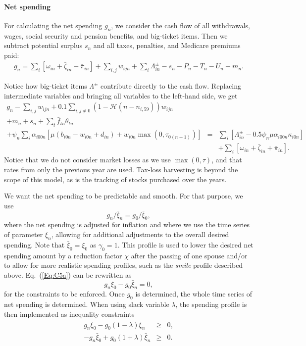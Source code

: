 \documentclass{report}[fleqn,11pt]
\begin{document}
\paragraph*{Net spending}
	For calculating the net spending $g_n$, we consider the cash flow of all withdrawals,
	wages, social security and pension benefits, and big-ticket items. 
	Then we subtract potential surplus $s_{n}$ and all taxes, penalties, and Medicare premiums paid:
	\begin{eqnarray}
		g_n = \sum_i [\omega_{in} + \bar{\zeta}_{in} + \bar{\pi}_{in} ] 
		+ \sum_{i,j} w_{ijn} + \sum_i \Lambda^\pm_{in} - s_{n}
		- P_n - T_n - U_n - m_n.
	\end{eqnarray}

	Notice how big-ticket items $\Lambda^\pm$ contribute directly to the cash flow.
	Replacing intermediate variables and bringing all variables to the left-hand side, we get
	\begin{eqnarray}
		\label{Eq:C4}
		g_n - \sum_{i,j} w_{ijn} + 0.1 \sum_{i,j\neq0} (1-\mathcal{H}(n - n_{i, 59})) w_{ijn}\nonumber\\
                + m_n + s_n + \sum_t \bar{f}_{tn} \theta_{t n} &&\nonumber \\
		+ \psi_n\sum_i \alpha_{i00n} \left[\mu(b_{i0n} - w_{i0n} + d_{in})
		+ w_{i0n}\max(0, \tau_{0(n-1)})\right] 
		&=& \sum_i [\Lambda^\pm_{in} - 0.5\psi_n\mu\alpha_{i00n}\kappa_{i0n}] \nonumber\\
                && + \sum_i [\omega_{in} + \bar{\zeta}_{in} + \bar{\pi}_{in} ].
	\end{eqnarray}
	Notice that we do not consider market losses as we use $\max(0, \tau)$, and that
	rates from only the previous year are used. Tax-loss
	harvesting is beyond the scope of this model, as is the tracking of stocks
	purchased over the years.

	We want the net spending to be predictable and smooth. For that purpose, we use
\begin{equation}
	\label{Eq:C5a}
	g_{n}/\bar{\xi}_{n} = g_0/\bar{\xi}_0,
\end{equation}
where the net spending is adjusted for inflation and where we use the time series of parameter $\xi_n$,
allowing for additional adjustments to the overall desired spending.
Note that $\bar{\xi}_0 = \xi_0$ as $\gamma_0=1$.
This profile is used to lower the desired net spending amount by a reduction factor $\chi$
after the passing of one spouse and/or to allow for more realistic spending profiles, such as
the {\em smile} profile described above.
Eq.~(\ref{Eq:C5a}) can be rewritten as
\begin{equation}
	\label{Eq:C5}
	g_n \xi_0 - g_0 \bar{\xi}_n = 0,
\end{equation}
for the constraints to be enforced. Once $g_0$ is determined, the whole time series of net spending
is determined.
When using slack variable $\lambda$, the spending profile is then implemented as inequality constraints
\begin{eqnarray}
	\label{Eq:lambdha}
	g_n \bar{\xi}_0 - g_0 (1 - \lambda) \bar{\xi}_n &\geq&  0, \nonumber\\
	-g_n \bar{\xi}_0 + g_0 (1 + \lambda) \bar{\xi}_n &\geq&  0.
\end{eqnarray}
\end{document}
